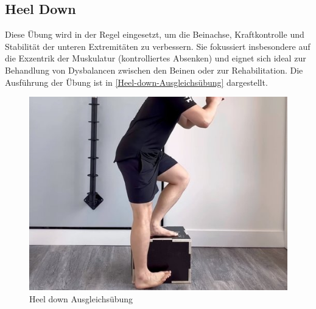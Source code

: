 
\subsection{Heel Down}

Diese Übung wird in der Regel eingesetzt, um die Beinachse, Kraftkontrolle und Stabilität der unteren Extremitäten zu verbessern. Sie fokussiert insbesondere auf die Exzentrik der Muskulatur (kontrolliertes Absenken) und eignet sich ideal zur Behandlung von Dysbalancen zwischen den Beinen oder zur Rehabilitation. Die Ausführung der Übung ist in \autoref{Heel-down-Ausgleichsübung} dargestellt.
\\
\begin{figure}[h!]
    \centering
    \includegraphics[width=0.5\linewidth]{img/Heel-down-Uebung.jpg}
    \caption{Heel down Ausgleichsübung \cite{rehabhero}}
    \label{Heel-down-Ausgleichsübung}
\end{figure}
